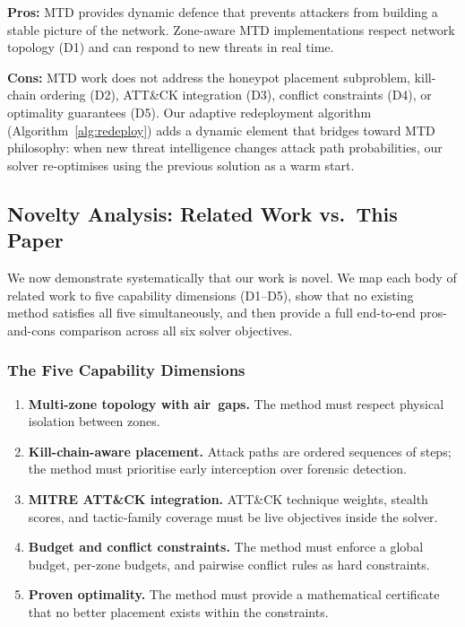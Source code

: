 \documentclass[journal]{IEEEtran}
\begin{document}
\textbf{Pros:} MTD provides dynamic defence that prevents
attackers from building a stable picture of the network.
Zone-aware MTD implementations respect network topology (D1)
and can respond to new threats in real time.

\textbf{Cons:} MTD work does not address the honeypot
placement subproblem, kill-chain ordering (D2), ATT\&CK
integration (D3), conflict constraints (D4), or optimality
guarantees (D5).
Our adaptive redeployment algorithm
(Algorithm~\ref{alg:redeploy}) adds a dynamic element that
bridges toward MTD philosophy: when new threat intelligence
changes attack path probabilities, our solver re-optimises
using the previous solution as a warm start.

\subsection{Novelty Analysis: Related Work vs.\ This Paper}
\label{subsec:novelty}

We now demonstrate systematically that our work is novel.
We map each body of related work to five capability
dimensions (D1--D5), show that no existing method satisfies
all five simultaneously, and then provide a full end-to-end
pros-and-cons comparison across all six solver objectives.

\subsubsection{The Five Capability Dimensions}

\begin{enumerate}
  \item[\textbf{D1}] \textbf{Multi-zone topology with
  air~gaps.} The method must respect physical isolation
  between zones.

  \item[\textbf{D2}] \textbf{Kill-chain-aware placement.}
  Attack paths are ordered sequences of steps; the method
  must prioritise early interception over forensic detection.

  \item[\textbf{D3}] \textbf{MITRE ATT\&CK integration.}
  ATT\&CK technique weights, stealth scores, and
  tactic-family coverage must be live objectives inside the
  solver.

  \item[\textbf{D4}] \textbf{Budget and conflict
  constraints.} The method must enforce a global budget,
  per-zone budgets, and pairwise conflict rules as hard
  constraints.

  \item[\textbf{D5}] \textbf{Proven optimality.} The method
  must provide a mathematical certificate that no better
  placement exists within the constraints.
\end{enumerate}
\end{document}
